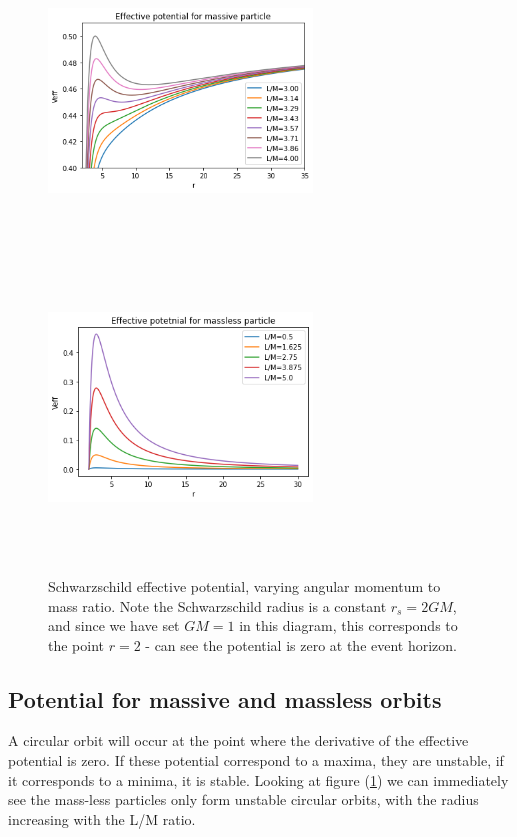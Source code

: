 \begin{figure}[h]
    \centering
    \includegraphics[width=7cm, height=8cm]{orbits_images/massive_particle_S.png}
    \includegraphics[width=7cm, height=8cm]{orbits_images/massless_particle_S.png}
    \caption{Schwarzschild effective potential, varying angular momentum to mass ratio. Note the Schwarzschild radius is a constant $r_s=2 G M$, and since we have set $G M = 1$ in this diagram, this corresponds to the point $r=2$ - can see the potential is zero at the event horizon.}
    \label{fig:Schwarzschild effective potential}
\end{figure}

\subsection{Potential for massive and massless orbits}\label{sec:Potential for massive and massless orbits}

A circular orbit will occur at the point where the derivative of the effective potential is zero. If these potential correspond to a maxima, they are unstable, if it corresponds to a minima, it is stable. Looking at figure (\ref{fig:Schwarzschild effective potential}) we can immediately see the mass-less particles only form unstable circular orbits, with the radius increasing with the L/M ratio.

